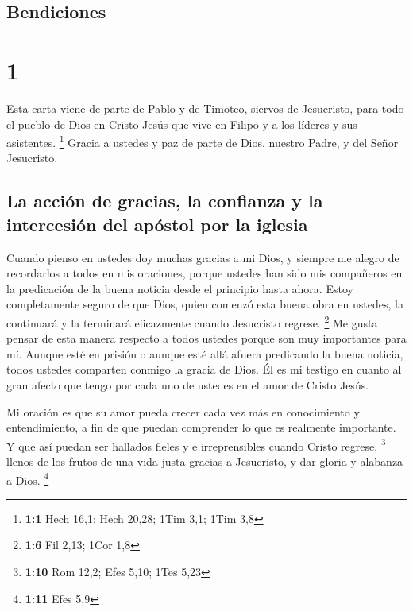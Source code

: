 \hypertarget{bendiciones}{%
\subsection{Bendiciones}\label{bendiciones}}

\hypertarget{section}{%
\section{1}\label{section}}

 Esta carta viene de parte de Pablo y de Timoteo, siervos
de Jesucristo, para todo el pueblo de Dios en Cristo Jesús que vive en
Filipo y a los líderes y sus asistentes. \footnote{\textbf{1:1} Hech
  16,1; Hech 20,28; 1Tim 3,1; 1Tim 3,8}  Gracia a ustedes
y paz de parte de Dios, nuestro Padre, y del Señor Jesucristo.

\hypertarget{la-acciuxf3n-de-gracias-la-confianza-y-la-intercesiuxf3n-del-apuxf3stol-por-la-iglesia}{%
\subsection{La acción de gracias, la confianza y la intercesión del
apóstol por la
iglesia}\label{la-acciuxf3n-de-gracias-la-confianza-y-la-intercesiuxf3n-del-apuxf3stol-por-la-iglesia}}

 Cuando pienso en ustedes doy muchas gracias a mi Dios,
 y siempre me alegro de recordarlos a todos en mis
oraciones,  porque ustedes han sido mis compañeros en la
predicación de la buena noticia desde el principio hasta ahora.
 Estoy completamente seguro de que Dios, quien comenzó
esta buena obra en ustedes, la continuará y la terminará eficazmente
cuando Jesucristo regrese. \footnote{\textbf{1:6} Fil 2,13; 1Cor 1,8}
 Me gusta pensar de esta manera respecto a todos ustedes
porque son muy importantes para mí. Aunque esté en prisión o aunque esté
allá afuera predicando la buena noticia, todos ustedes comparten conmigo
la gracia de Dios.  Él es mi testigo en cuanto al gran
afecto que tengo por cada uno de ustedes en el amor de Cristo Jesús.

 Mi oración es que su amor pueda crecer cada vez más en
conocimiento y entendimiento,  a fin de que puedan
comprender lo que es realmente importante. Y que así puedan ser hallados
fieles y e irreprensibles cuando Cristo regrese, \footnote{\textbf{1:10}
  Rom 12,2; Efes 5,10; 1Tes 5,23}  llenos de los frutos
de una vida justa gracias a Jesucristo, y dar gloria y alabanza a Dios.
\footnote{\textbf{1:11} Efes 5,9}

